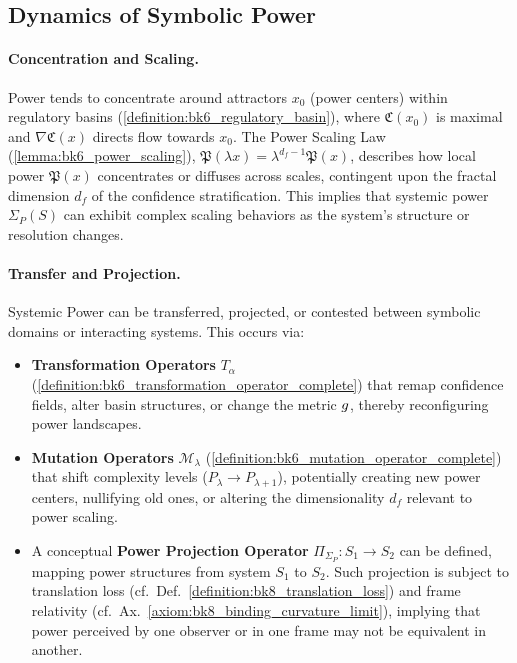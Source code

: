 \subsection{Dynamics of Symbolic Power}
\label{subsec:bk7_dynamics_symbolic_power}

\paragraph{Concentration and Scaling.} Power tends to concentrate around attractors \(x_0\) (power centers) within regulatory basins (\ref{definition:bk6_regulatory_basin}), where \(\mathfrak{C}(x_0)\) is maximal and \(\nabla \mathfrak{C}(x)\) directs flow towards \(x_0\). The Power Scaling Law (\ref{lemma:bk6_power_scaling}), \(\mathfrak{P}(\lambda x) = \lambda^{d_f - 1} \mathfrak{P}(x)\), describes how local power \(\mathfrak{P}(x)\) concentrates or diffuses across scales, contingent upon the fractal dimension \(d_f\) of the confidence stratification. This implies that systemic power \(\Sigma_P(S)\) can exhibit complex scaling behaviors as the system's structure or resolution changes.

\paragraph{Transfer and Projection.} Systemic Power can be transferred, projected, or contested between symbolic domains or interacting systems. This occurs via:
\begin{itemize}
    \item \textbf{Transformation Operators} \(T_\alpha\) (\ref{definition:bk6_transformation_operator_complete}) that remap confidence fields, alter basin structures, or change the metric \(g\), thereby reconfiguring power landscapes.
    \item \textbf{Mutation Operators} \(\mathcal{M}_\lambda\) (\ref{definition:bk6_mutation_operator_complete}) that shift complexity levels (\(P_\lambda \to P_{\lambda+1}\)), potentially creating new power centers, nullifying old ones, or altering the dimensionality \(d_f\) relevant to power scaling.
    \item A conceptual \textbf{Power Projection Operator} \(\Pi_{\Sigma_P} : S_1 \to S_2\) can be defined, mapping power structures from system \(S_1\) to \(S_2\). Such projection is subject to translation loss (cf.~Def.~\ref{definition:bk8_translation_loss}) and frame relativity (cf.~Ax.~\ref{axiom:bk8_binding_curvature_limit}), implying that power perceived by one observer or in one frame may not be equivalent in another.
\end{itemize}

